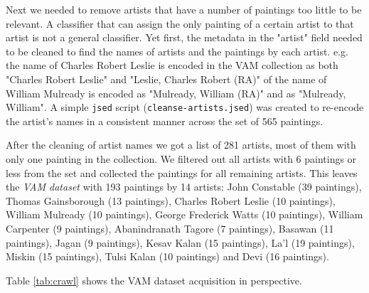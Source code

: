 \documentclass[11pt,a4paper,twoside,openright]{report}
\begin{document}
Next we needed to remove artists that have a number of paintings too little to
be relevant.  A classifier that can assign the only painting of a certain
artist to that artist is not a general classifier.  Yet first, the metadata in
the "artist" field needed to be cleaned to find the names of artists and the
paintings by each artist.  e.g. the name of Charles Robert Leslie is encoded in
the VAM collection as both "Charles Robert Leslie" and "Leslie, Charles Robert
(RA)" of the name of William Mulready is encoded as "Mulready, William (RA)"
and as "Mulready, William".  A simple \texttt{jsed} script
(\texttt{cleanse-artists.jsed}) was created to re-encode the artist's names in
a consistent manner across the set of 565 paintings.

After the cleaning of artist names we got a list of 281 artists, most of them
with only one painting in the collection.  We filtered out all artists with 6
paintings or less from the set and collected the paintings for all remaining
artists.  This leaves the \emph{VAM dataset} with 193 paintings by 14 artists:
John Constable (39 paintings), Thomas Gainsborough (13 paintings), Charles
Robert Leslie (10 paintings), William Mulready (10 paintings), George Frederick
Watts (10 paintings), William Carpenter (9 paintings), Abanindranath Tagore (7
paintings), Basawan (11 paintings), Jagan (9 paintings), Kesav Kalan (15
paintings), La'l (19 paintings), Miskin (15 paintings), Tulsi Kalan (10
paintings) and Devi (16 paintings).

Table \ref{tab:crawl} shows the VAM dataset acquisition in perspective.
\end{document}
